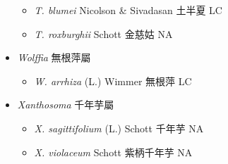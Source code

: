 \begin{itemize}
  \begin{itemize}
        \item[] \textit{T. blumei} Nicolson \& Sivadasan  土半夏   LC
        \item[] \textit{T. roxburghii} Schott  金慈姑   NA
  \end{itemize}
 \item[] \textit{Wolffia} 無根萍屬
                                
  \begin{itemize}
        \item[] \textit{W. arrhiza} (L.) Wimmer  無根萍   LC
  \end{itemize}
 \item[] \textit{Xanthosoma} 千年芋屬
                                
  \begin{itemize}
        \item[] \textit{X. sagittifolium} (L.) Schott  千年芋   NA
        \item[] \textit{X. violaceum} Schott  紫柄千年芋   NA
  \end{itemize}
  \end{itemize}
